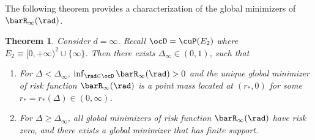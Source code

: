 \documentclass[11pt]{article}
\newtheorem{theorem}{Theorem}
\begin{document}
The following theorem provides a characterization of the global minimizers of $\barR_\infty(\rad)$. 

\begin{theorem}\label{thm:global_minimizer_infinite_d_anisotropic}
Consider $d=\infty$. Recall $\ocD = \cuP(E_2)$ where $E_2 \equiv [0, +\infty)^2 \cup \{\infty\}$. Then there exists $\Delta_{\infty}\in (0,1)$, such that
%
\begin{enumerate}
\item For $\Delta < \Delta_\infty$, $\inf_{\rad\in\ocD}\barR_\infty(\rad)>0$ and the unique global minimizer of risk function $\barR_\infty(\rad)$ is a point mass located at $(r_*, 0)$ for some $r_* = r_*(\Delta)\in(0,\infty)$. 
\item For  $\Delta \ge \Delta_\infty$, all global minimizers of risk function $\barR_\infty(\rad)$ have risk zero, and there exists a global minimizer that has finite support. 
\end{enumerate}
%
\end{theorem}
\end{document}
